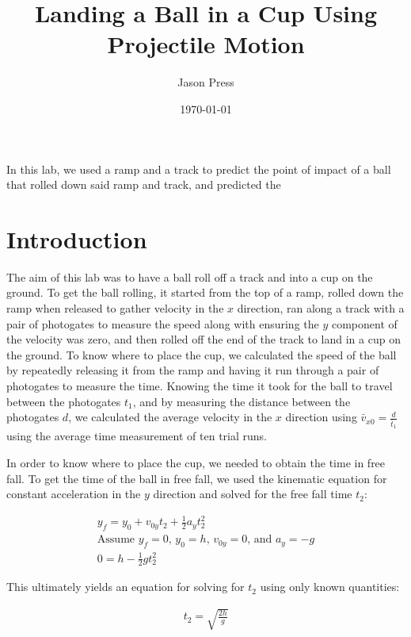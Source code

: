 \documentclass[12pt]{article}
\author{Jason Press}
\date{\today}
\title{Landing a Ball in a Cup Using Projectile Motion}
\begin{document}
\maketitle
\begin{ABSTRACT}


In this lab, we used a ramp and a track to predict the point of impact of a ball that rolled down said ramp and track, and predicted the
\end{ABSTRACT}
\section{Introduction}
\label{sec:org393cc0a}

The aim of this lab was to have a ball roll off a track and into a cup on the ground. To get the ball rolling, it started from the top of a ramp, rolled down the ramp when released to gather velocity in the \(x\) direction, ran along a track with a pair of photogates to measure the speed along with ensuring the \(y\) component of the velocity was zero, and then rolled off the end of the track to land in a cup on the ground. To know where to place the cup, we calculated the speed of the ball by repeatedly releasing it from the ramp and having it run through a pair of photogates to measure the time. Knowing the time it took for the ball to travel between the photogates \(t_1\), and by measuring the distance between the photogates \(d\), we calculated the average velocity in the \(x\) direction using \(\bar{v}_{x0} = \frac{d}{\bar{t}_{1}}\) using the average time measurement of ten trial runs.

In order to know where to place the cup, we needed to obtain the time in free fall. To get the time of the ball in free fall, we used the kinematic equation for constant acceleration in the \(y\) direction and solved for the free fall time \(t_{2}\):


\begin{align}
y_{f} = y_{0} + v_{0y}t_{2} + \frac{1}{2} a_{y}t_{2}^{2} \\
\text{Assume } y_{f} = 0\text{, }y_{0} = h\text{, } v_{0y} = 0\text{, and } a_{y} = -g \\
0 = h - \frac{1}{2} g t_{2}^{2}
\end{align}

This ultimately yields an equation for solving for \(t_2\) using only known quantities:

\begin{align}
        t_{2} = \sqrt{\frac{2h}{g}}
\end{align}
\end{document}
